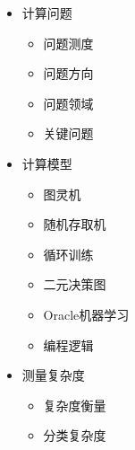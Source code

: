 %
\iffalse
\begin{itemize}
    \item 计算问题
        \begin{itemize}\itemsep=0pt\parskip=0pt
            \item 问题测度
            \item 问题方向
            \item 问题领域
            \item 关键问题
        \end{itemize}
    \item 计算模型
        \begin{itemize}\itemsep=0pt\parskip=0pt
            \item 图灵机
            \item 随机存取机
            \item 循环训练
            \item 二元决策图
            \item Oracle机器学习
            \item 编程逻辑
        \end{itemize}
    \item 测量复杂度
        \begin{itemize}\itemsep=0pt\parskip=0pt
            \item 复杂度衡量
            \item 分类复杂度

\end{itemize}
\end{itemize}
